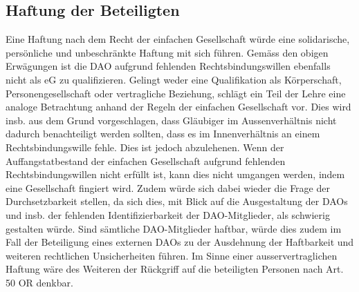 \documentclass[a4paper,12pt]{report}
\begin{document}
	\subsection{Haftung der Beteiligten}
	\startsubsection
	Eine Haftung nach dem Recht der einfachen Gesellschaft würde eine solidarische, persönliche und unbeschränkte Haftung mit sich führen. Gemäss den obigen Erwägungen ist die DAO aufgrund fehlenden Rechtsbindungswillen ebenfalls nicht als eG zu qualifizieren. Gelingt weder eine Qualifikation als Körperschaft, Personengesellschaft oder vertragliche Beziehung, schlägt ein Teil der Lehre eine analoge Betrachtung anhand der Regeln der einfachen Gesellschaft vor. Dies wird insb. aus dem Grund vorgeschlagen, dass Gläubiger im Aussenverhältnis nicht dadurch benachteiligt werden sollten, dass es im Innenverhältnis an einem Rechtsbindungswille fehle. Dies ist jedoch abzulehenen. Wenn der Auffangstatbestand der einfachen Gesellschaft aufgrund fehlenden Rechtsbindungswillen nicht erfüllt ist, kann dies nicht umgangen werden, indem eine Gesellschaft fingiert wird. Zudem würde sich dabei wieder die Frage der Durchsetzbarkeit stellen, da sich dies, mit Blick auf die Ausgestaltung der DAOs und insb. der fehlenden Identifizierbarkeit der DAO-Mitglieder, als schwierig gestalten würde. Sind sämtliche DAO-Mitglieder haftbar, würde dies zudem im Fall der Beteiligung eines externen DAOs zu der Ausdehnung der Haftbarkeit und weiteren rechtlichen Unsicherheiten führen. Im Sinne einer ausservertraglichen Haftung wäre des Weiteren der Rückgriff auf die beteiligten Personen nach Art. 50 OR denkbar.
	\closesection
\end{document}
